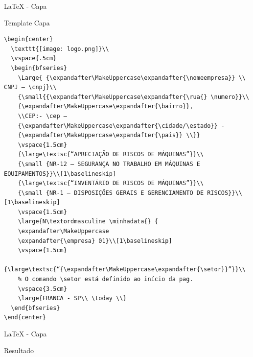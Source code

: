 \documentclass[bigger]{beamer}
\begin{document}
{\begin{frame}[label={sec:orgd74e980},fragile,shrink = 30]{\LaTeX{} - Capa}
 \begin{block}{Template Capa}
\begin{verbatim}
\begin{center}
  \texttt{[image: logo.png]}\\
  \vspace{.5cm}
  \begin{bfseries}
    \Large{ {\expandafter\MakeUppercase\expandafter{\nomeempresa}} \\ CNPJ – \cnpj}\\
    {\small{{\expandafter\MakeUppercase\expandafter{\rua{} \numero}}\\
	{\expandafter\MakeUppercase\expandafter{\bairro}},
	\\CEP:- \cep –
	{\expandafter\MakeUppercase\expandafter{\cidade/\estado}} -
	{\expandafter\MakeUppercase\expandafter{\pais}} \\}}
    \vspace{1.5cm}
    {\large\textsc{“APRECIAÇÃO DE RISCOS DE MÁQUINAS”}}\\
    {\small {NR-12 – SEGURANÇA NO TRABALHO EM MÁQUINAS E EQUIPAMENTOS}}\\[1\baselineskip]
    {\large\textsc{“INVENTÁRIO DE RISCOS DE MÁQUINAS”}}\\
    {\small {NR-1 – DISPOSIÇÕES GERAIS E GERENCIAMENTO DE RISCOS}}\\[1\baselineskip]
    \vspace{1.5cm}
    \large{N\textordmasculine \minhadata{} {
	\expandafter\MakeUppercase
	\expandafter{\empresa} 01}\\[1\baselineskip]
    \vspace{1.5cm}
    {\large\textsc{“{\expandafter\MakeUppercase\expandafter{\setor}}”}}\\
    % O comando \setor está definido ao início da pag.
    \vspace{3.5cm}
    \large{FRANCA - SP\\ \today \\}
  \end{bfseries}
\end{center}
\end{verbatim}
\end{block}
\end{frame}
\begin{frame}[label={sec:org3684232}]{\LaTeX{} - Capa}
\begin{block}{Resultado}

\end{block}
\end{frame}}
\end{document}
